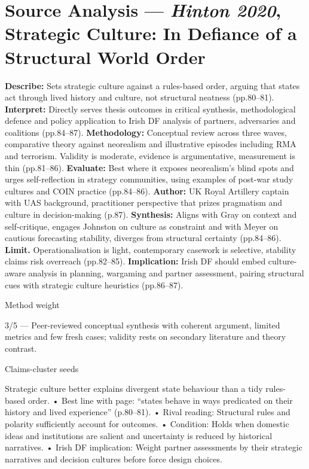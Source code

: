 \section*{Source Analysis — \textit{Hinton 2020}, Strategic Culture: In Defiance of a Structural World Order}
\textbf{Describe:} Sets strategic culture against a rules-based order, arguing that states act through lived history and culture, not structural neatness (pp.80–81).
\textbf{Interpret:} Directly serves thesis outcomes in critical synthesis, methodological defence and policy application to Irish DF analysis of partners, adversaries and coalitions (pp.84–87).
\textbf{Methodology:} Conceptual review across three waves, comparative theory against neorealism and illustrative episodes including RMA and terrorism. Validity is moderate, evidence is argumentative, measurement is thin (pp.81–86).
\textbf{Evaluate:} Best where it exposes neorealism’s blind spots and urges self-reflection in strategy communities, using examples of post-war study cultures and COIN practice (pp.84–86).
\textbf{Author:} UK Royal Artillery captain with UAS background, practitioner perspective that prizes pragmatism and culture in decision-making (p.87).
\textbf{Synthesis:} Aligns with Gray on context and self-critique, engages Johnston on culture as constraint and with Meyer on cautious forecasting stability, diverges from structural certainty (pp.84–86).
\textbf{Limit.} Operationalisation is light, contemporary casework is selective, stability claims risk overreach (pp.82–85).
\textbf{Implication:} Irish DF should embed culture-aware analysis in planning, wargaming and partner assessment, pairing structural cues with strategic culture heuristics (pp.86–87).

Method weight

3/5 — Peer-reviewed conceptual synthesis with coherent argument, limited metrics and few fresh cases; validity rests on secondary literature and theory contrast.

Claims-cluster seeds

Strategic culture better explains divergent state behaviour than a tidy rules-based order.
• Best line with page: “states behave in ways predicated on their history and lived experience” (p.80–81).
• Rival reading: Structural rules and polarity sufficiently account for outcomes.
• Condition: Holds when domestic ideas and institutions are salient and uncertainty is reduced by historical narratives.
• Irish DF implication: Weight partner assessments by their strategic narratives and decision cultures before force design choices.

